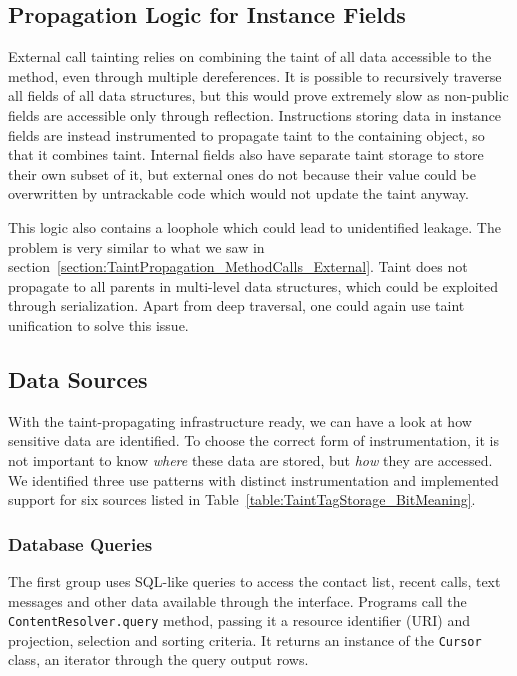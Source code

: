 \documentclass[12pt,twoside,notitlepage]{report}
\begin{document}
\subsection{Propagation Logic for Instance Fields}

\parbox{\textwidth}{
External call tainting relies on combining the taint of all data accessible to the method, even through multiple dereferences. It is possible to recursively traverse all fields of all data structures, but this would prove extremely slow as non-public fields are accessible only through reflection. Instructions storing data in instance fields are instead instrumented to propagate taint to the containing object, so that it combines taint. Internal fields also have separate taint storage to store their own subset of it, but external ones do not because their value could be overwritten by untrackable code which would not update the taint anyway.
}

This logic also contains a loophole which could lead to unidentified leakage. The problem is very similar to what we saw in section~\ref{section:TaintPropagation_MethodCalls_External}. Taint does not propagate to all parents in multi-level data structures, which could be exploited through serialization. Apart from deep traversal, one could again use taint unification to solve this issue.

\subsection{Data Sources}

With the taint-propagating infrastructure ready, we can have a look at how sensitive data are identified. To choose the correct form of instrumentation, it is not important to know \emph{where} these data are stored, but \emph{how} they are accessed. We identified three use patterns with distinct instrumentation and implemented support for six sources listed in Table~\ref{table:TaintTagStorage_BitMeaning}.

\subsubsection{Database Queries}

The first group uses SQL-like queries to access the contact list, recent calls, text messages and other data available through the interface. Programs call the \verb$ContentResolver.query$ method, passing it a resource identifier (URI) and projection, selection and sorting criteria. It returns an instance of the \verb$Cursor$ class, an iterator through the query output rows. 
\end{document}
